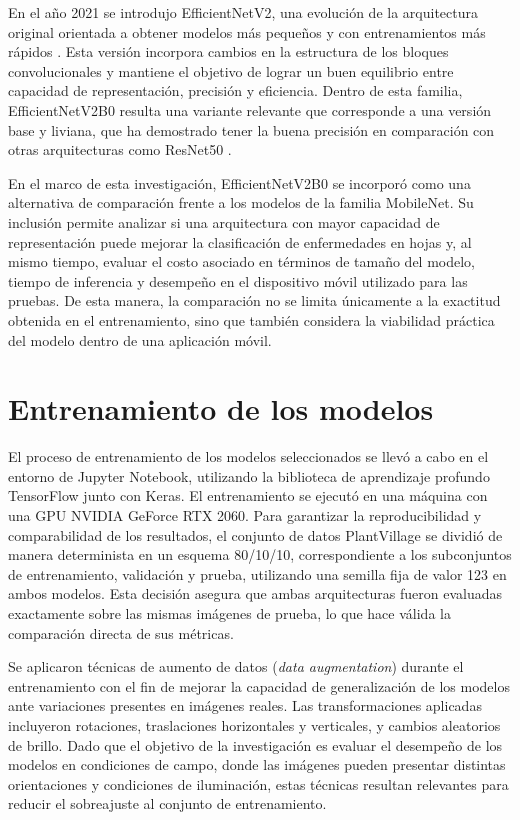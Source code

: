 En el año 2021 se introdujo EfficientNetV2, una evolución de la arquitectura original orientada a obtener modelos más pequeños y con
entrenamientos más rápidos \cite{DBLP:journals/corr/abs-2104-00298}. Esta versión incorpora cambios en la estructura de los bloques
convolucionales y mantiene el objetivo de lograr un buen equilibrio entre capacidad de representación, precisión y eficiencia. Dentro
de esta familia, EfficientNetV2B0 resulta una variante relevante que corresponde a una versión base y liviana, que ha demostrado
tener la buena precisión en comparación con otras arquitecturas como ResNet50 \cite{molcan2023classification}.

En el marco de esta investigación, EfficientNetV2B0 se incorporó como una alternativa de comparación frente a los modelos de la familia
MobileNet. Su inclusión permite analizar si una arquitectura con mayor capacidad de representación puede mejorar la clasificación de
enfermedades en hojas y, al mismo tiempo, evaluar el costo asociado en términos de tamaño del modelo, tiempo de inferencia y desempeño
en el dispositivo móvil utilizado para las pruebas. De esta manera, la comparación no se limita únicamente a la exactitud obtenida en
el entrenamiento, sino que también considera la viabilidad práctica del modelo dentro de una aplicación móvil.

\section{Entrenamiento de los modelos}

El proceso de entrenamiento de los modelos seleccionados se llevó a cabo en el entorno de Jupyter Notebook, utilizando
la biblioteca de aprendizaje profundo TensorFlow junto con Keras. El entrenamiento se ejecutó en una
máquina con una GPU NVIDIA GeForce RTX 2060. Para garantizar la reproducibilidad y comparabilidad de los resultados, el
conjunto de datos PlantVillage se dividió de manera determinista en un esquema 80/10/10, correspondiente a los subconjuntos de
entrenamiento, validación y prueba, utilizando una semilla fija de valor 123 en ambos modelos. Esta decisión asegura que ambas
arquitecturas fueron evaluadas exactamente sobre las mismas imágenes de prueba, lo que hace válida la comparación directa de sus
métricas.

Se aplicaron técnicas de aumento de datos (\textit{data augmentation}) durante el entrenamiento con el fin de mejorar la
capacidad de generalización de los modelos ante variaciones presentes en imágenes reales. Las transformaciones aplicadas incluyeron
rotaciones, traslaciones horizontales y verticales, y cambios aleatorios de brillo. Dado que el objetivo de la investigación es
evaluar el desempeño de los modelos en condiciones de campo, donde las imágenes pueden presentar distintas orientaciones y
condiciones de iluminación, estas técnicas resultan relevantes para reducir el sobreajuste al conjunto de entrenamiento.


